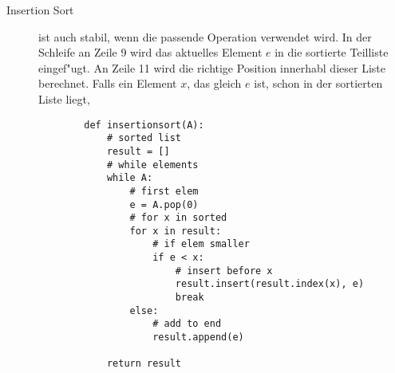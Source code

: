 \documentclass[a4paper, 12pt]{article}
\begin{document}
\begin{description}
	\item[Insertion Sort]
	ist auch stabil, wenn die passende Operation verwendet wird. In der Schleife an Zeile 9 wird das aktuelles Element $e$ in die sortierte Teilliste eingef"ugt. An Zeile 11 wird die richtige Position innerhabl dieser Liste berechnet. Falls ein Element $x$, das gleich $e$ ist, schon in der sortierten Liste liegt, 

	\begin{lstlisting}
		def insertionsort(A):
			# sorted list
			result = []
			# while elements
			while A:
				# first elem
				e = A.pop(0)
				# for x in sorted
				for x in result:
					# if elem smaller
					if e < x:
						# insert before x
						result.insert(result.index(x), e)
						break
				else:
					# add to end
					result.append(e)

			return result
	\end{lstlisting}
\end{description}
\end{document}
